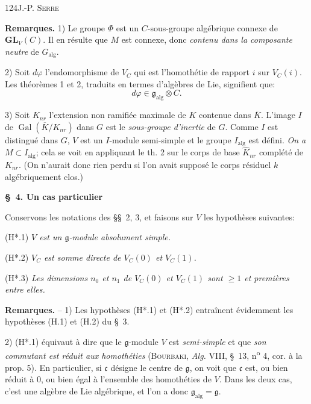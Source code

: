 124\hfill J.-P. \textsc{Serre}

\textbf{Remarques.} 1) Le groupe $\Phi$ est un $C$-sous-groupe algébrique connexe de $\mathbf{GL}_V(C)$. Il en résulte que $M$ est connexe, donc \textit{contenu dans la composante neutre} de $G_{\mathrm{alg}}$.

2) Soit $d\varphi$ l'endomorphisme de $V_C$ qui est l'homothétie de rapport $i$ sur $V_C(i)$. Les théorèmes 1 et 2, traduits en termes d'algèbres de Lie, signifient que:
\[
d\varphi\in\mathfrak g_{\mathrm{alg}}\otimes C.
\]

3) Soit $K_{nr}$ l'extension non ramifiée maximale de $K$ contenue dans $\overline K$. L'image $I$ de $\operatorname{Gal}(\overline K/K_{nr})$ dans $G$ est le \textit{sous-groupe d'inertie} de $G$. Comme $I$ est distingué dans $G$, $V$ est un $I$-module semi-simple et le groupe $I_{\mathrm{alg}}$ est défini. \textit{On a $M\subset I_{\mathrm{alg}}$}; cela se voit en appliquant le th. 2 sur le corps de base $\widehat K_{nr}$ complété de $K_{nr}$. (On n'aurait donc rien perdu si l'on avait supposé le corps résiduel $k$ algébriquement clos.)

\begin{center}\textbf{\S\ 4. Un cas particulier}\end{center}

Conservons les notations des \S\S\ 2, 3, et faisons sur $V$ les hypothèses suivantes:

(H*.1) \textit{$V$ est un $\mathfrak g$-module absolument simple.}

(H*.2) \textit{$V_C$ est somme directe de $V_C(0)$ et $V_C(1)$.}

(H*.3) \textit{Les dimensions $n_0$ et $n_1$ de $V_C(0)$ et $V_C(1)$ sont $\geq1$ et premières entre elles.}

\textbf{Remarques.} -- 1) Les hypothèses (H*.1) et (H*.2) entraînent évidemment les hypothèses (H.1) et (H.2) du \S\ 3.

2) (H*.1) équivaut à dire que le $\mathfrak g$-module $V$ est \textit{semi-simple} et que \textit{son commutant est réduit aux homothéties} (\textsc{Bourbaki}, \textit{Alg.} VIII, \S\ 13, n\textsuperscript{o} 4, cor. à la prop. 5). En particulier, si $\mathfrak c$ désigne le centre de $\mathfrak g$, on voit que $\mathfrak c$ est, ou bien réduit à 0, ou bien égal à l'ensemble des homothéties de $V$. Dans les deux cas, c'est une algèbre de Lie algébrique, et l'on a donc $\mathfrak g_{\mathrm{alg}}=\mathfrak g$.

